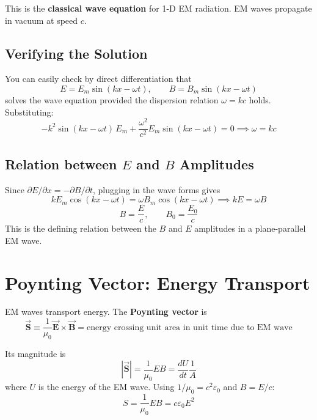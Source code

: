 \documentclass[11pt]{report}
\newcommand{\vbf}[1]{\vec{\mathbf{#1}}}
\begin{document}
This is the \textbf{classical wave equation} for 1-D EM radiation. EM waves propagate in vacuum at speed $c$.

\subsection*{Verifying the Solution}

You can easily check by direct differentiation that
\begin{equation}
E = E_m \sin(kx - \omega t), \qquad B = B_m \sin(kx - \omega t)
\end{equation}
solves the wave equation provided the dispersion relation $\omega = kc$ holds. Substituting:
\begin{equation}
-k^2 \sin(kx-\omega t)\,E_m + \frac{\omega^2}{c^2} E_m \sin(kx-\omega t) = 0 \implies \omega = kc
\end{equation}

\subsection*{Relation between $E$ and $B$ Amplitudes}

Since $\partial E/\partial x = -\partial B/\partial t$, plugging in the wave forms gives
\begin{equation}
k E_m \cos(kx-\omega t) = \omega B_m \cos(kx-\omega t) \implies kE = \omega B
\end{equation}
\begin{equation}
\boxed{B = \frac{E}{c}, \qquad B_0 = \frac{E_0}{c}}
\end{equation}
This is the defining relation between the $B$ and $E$ amplitudes in a plane-parallel EM wave.

\section{Poynting Vector: Energy Transport}

EM waves transport energy. The \textbf{Poynting vector} is
\begin{equation}
\boxed{\vbf{S} \equiv \frac{1}{\mu_0}\vbf{E}\times\vbf{B} = \text{energy crossing unit area in unit time due to EM wave}}
\end{equation}

Its magnitude is
\begin{equation}
|\vbf{S}| = \frac{1}{\mu_0}EB = \frac{dU}{dt}\frac{1}{A}
\end{equation}
where $U$ is the energy of the EM wave. Using $1/\mu_0 = c^2\varepsilon_0$ and $B = E/c$:
\begin{equation}
S = \frac{1}{\mu_0}EB = c\varepsilon_0 E^2
\end{equation}
\end{document}
